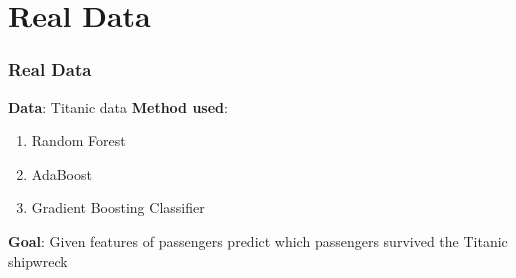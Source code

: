 \section{Real Data}

\begin{frame}[fragile] %
    \frametitle{Real Data}
    \textbf{Data}: Titanic data
    \newline \textbf{Method used}: 
    \begin{enumerate}
        \item Random Forest
        \item AdaBoost
        \item Gradient Boosting Classifier
    \end{enumerate}
    \newline \textbf{Goal}: Given features of passengers predict which passengers survived the Titanic shipwreck 
    

\end{frame}
    


